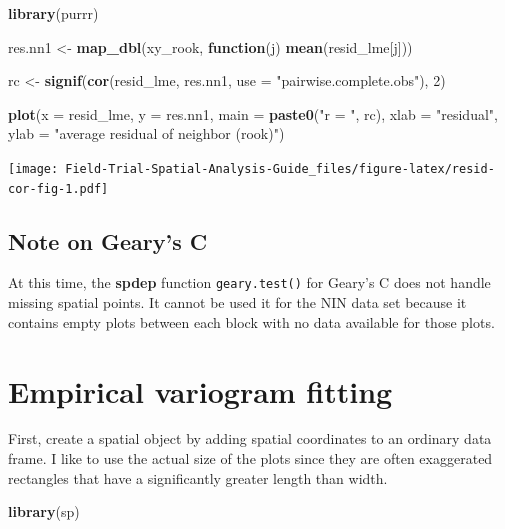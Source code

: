 \documentclass[
]{book}
\newenvironment{Shaded}{\begin{snugshade}}{\end{snugshade}}
\newcommand{\AttributeTok}[1]{\textcolor[rgb]{0.13,0.29,0.53}{#1}}
\newcommand{\ControlFlowTok}[1]{\textcolor[rgb]{0.13,0.29,0.53}{\textbf{#1}}}
\newcommand{\DecValTok}[1]{\textcolor[rgb]{0.00,0.00,0.81}{#1}}
\newcommand{\FunctionTok}[1]{\textcolor[rgb]{0.13,0.29,0.53}{\textbf{#1}}}
\newcommand{\NormalTok}[1]{#1}
\newcommand{\OtherTok}[1]{\textcolor[rgb]{0.56,0.35,0.01}{#1}}
\newcommand{\StringTok}[1]{\textcolor[rgb]{0.31,0.60,0.02}{#1}}
\begin{document}
\begin{Shaded}
\begin{Highlighting}[]
\FunctionTok{library}\NormalTok{(purrr)}

\NormalTok{res.nn1 }\OtherTok{\textless{}{-}} \FunctionTok{map\_dbl}\NormalTok{(xy\_rook, }\ControlFlowTok{function}\NormalTok{(j) }\FunctionTok{mean}\NormalTok{(resid\_lme[j]))}
  
\NormalTok{rc }\OtherTok{\textless{}{-}} \FunctionTok{signif}\NormalTok{(}\FunctionTok{cor}\NormalTok{(resid\_lme, res.nn1, }\AttributeTok{use =} \StringTok{"pairwise.complete.obs"}\NormalTok{), }\DecValTok{2}\NormalTok{)}

\FunctionTok{plot}\NormalTok{(}\AttributeTok{x =}\NormalTok{ resid\_lme, }\AttributeTok{y =}\NormalTok{ res.nn1, }
     \AttributeTok{main =} \FunctionTok{paste0}\NormalTok{(}\StringTok{"r = "}\NormalTok{, rc), }\AttributeTok{xlab =} \StringTok{"residual"}\NormalTok{, }\AttributeTok{ylab =} \StringTok{"average residual of neighbor (rook)"}\NormalTok{)}
\end{Highlighting}
\end{Shaded}

\texttt{[image: Field-Trial-Spatial-Analysis-Guide\_files/figure-latex/resid-cor-fig-1.pdf]}

\hypertarget{note-on-gearys-c}{%
\subsection{Note on Geary's C}\label{note-on-gearys-c}}

At this time, the \textbf{spdep} function \texttt{geary.test()} for Geary's C does not handle missing spatial points. It cannot be used it for the NIN data set because it contains empty plots between each block with no data available for those plots.

\hypertarget{empirical-variogram-fitting}{%
\section{Empirical variogram fitting}\label{empirical-variogram-fitting}}

First, create a spatial object by adding spatial coordinates to an ordinary data frame. I like to use the actual size of the plots since they are often exaggerated rectangles that have a significantly greater length than width.

\begin{Shaded}
\begin{Highlighting}[]
\FunctionTok{library}\NormalTok{(sp)}
\end{Highlighting}
\end{Shaded}
\end{document}
